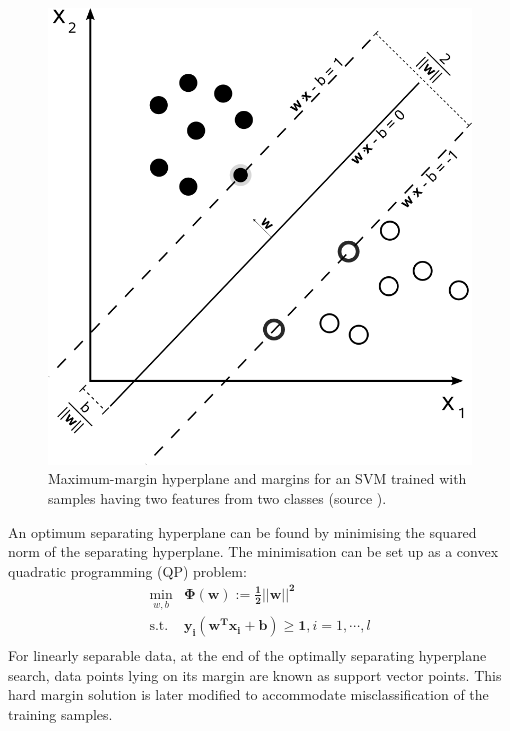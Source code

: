 \begin{enumerate}
	\begin{figure}
		\centering
		\includegraphics[scale=0.2]{fig/ml/svm_margin.JPG}
		\caption{Maximum-margin hyperplane and margins for an SVM trained with samples having two features from two classes (source \citet{cortes1995support}).}
		\label{fig:svm_margin}
	\end{figure}  
	
	 An optimum separating hyperplane can be found by minimising the squared norm of the separating hyperplane. The minimisation can be set up as a convex quadratic programming (QP) problem:   
	 \begin{equation}
		\begin{matrix}
		\min_{w,b} & \mathbf{\Phi(w):=\frac{1}{2}||w||^2}\\
		\textrm{s.t.} & \mathbf{y_i(w^Tx_i+b)\ge 1}, i=1,\cdots,l \\			 		 
		\end{matrix}
	 \end{equation}
	 For linearly separable data, at the end of the optimally separating hyperplane search, data points lying on its margin are known as support vector points. This hard margin solution is later modified \citep{veropoulos1999controlling} to accommodate misclassification of the training samples.  
	 

\end{enumerate}
